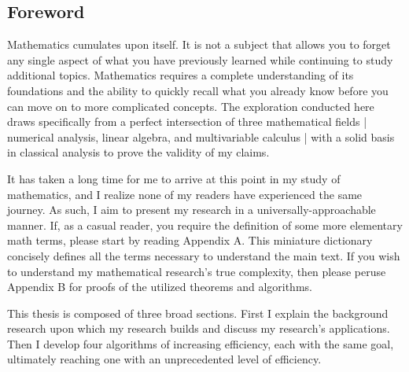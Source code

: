 \documentclass[letterpaper, 12pt]{article}
\begin{document}


\newpage
\begin{centering}
\tableofcontents %
\end{centering}







\newpage
\clearpage
\thispagestyle{empty}
\setcounter{page}{1}
\begin{centering}\section*{Foreword}\end{centering}

Mathematics cumulates upon itself. It is not a subject that allows you to forget any single aspect of what you have previously learned while continuing to study additional topics. Mathematics requires a complete understanding of its foundations and the ability to quickly recall what you already know before you can move on to more complicated concepts. The exploration conducted here draws specifically from a perfect intersection of three mathematical fields | numerical analysis, linear algebra, and multivariable calculus | with a solid basis in classical analysis to prove the validity of my claims.

It has taken a long time for me to arrive at this point in my study of mathematics, and I realize none of my readers have experienced the same journey. As such, I aim to present my research in a universally-approachable manner. If, as a casual reader, you require the definition of some more elementary math terms, please start by reading Appendix A. This miniature dictionary concisely defines all the terms necessary to understand the main text. If you wish to understand my mathematical research's true complexity, then please peruse Appendix B for proofs of the utilized theorems and algorithms.

This thesis is composed of three broad sections. First I explain the background research upon which my research builds and discuss my research's applications. Then I develop four algorithms of increasing efficiency, each with the same goal, ultimately reaching one with an unprecedented level of efficiency.
\end{document}
